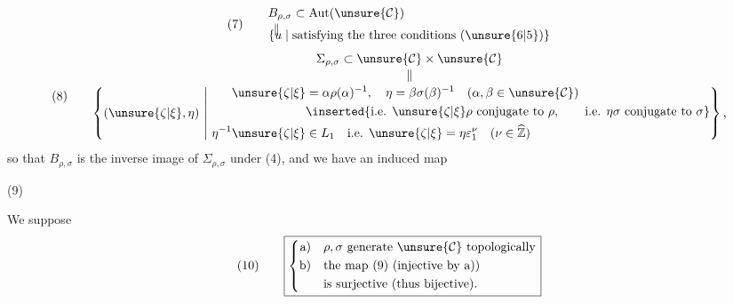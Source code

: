 
\[
(7)\qquad
\begin{aligned}
B_{\rho,\sigma}&\subset\mathrm{Aut}(\unsure{\mathcal{C}})\\[-2pt]
\Vert\quad&\\[-10pt]
\{u\mid{}&\text{satisfying the three conditions }(\unsure{6|5})\}
\end{aligned}
\]
\[
(8)\qquad
\begin{gathered}
\Sigma_{\rho,\sigma}\subset\unsure{\mathcal{C}}\times\unsure{\mathcal{C}}\\[-2pt]
\Vert\\[-2pt]
\left\{(\unsure{\zeta|\xi},\eta)\ \middle|\ 
\begin{aligned}
\unsure{\zeta|\xi}&=\alpha\rho(\alpha)^{-1},\quad
\eta=\beta\sigma(\beta)^{-1}\quad(\alpha,\beta\in\unsure{\mathcal{C}})\\
&\inserted{\text{i.e. }\unsure{\zeta|\xi}\rho\text{ conjugate to }\rho,\qquad\text{i.e. }\eta\sigma\text{ conjugate to }\sigma}\\
\eta^{-1}\unsure{\zeta|\xi}&\in L_1\quad\text{i.e. }\unsure{\zeta|\xi}=\eta\varepsilon_1^\nu\quad(\nu\in\widehat{\mathbb Z})
\end{aligned}\right\},
\end{gathered}
\]
so that $B_{\rho,\sigma}$ is the inverse image of $\Sigma_{\rho,\sigma}$ under (4), and we have an induced map
\begin{samepage}
\diagram{\begin{tikzcd}
B_{\rho,\sigma}\arrow[r,"\varphi=\varphi_{\rho,\sigma}"]&\Sigma_{\rho,\sigma}.
\end{tikzcd}}\hfill(9)
\end{samepage}

We suppose
\[
(10)\qquad\boxed{\left\{\begin{aligned}
\text{a)}\quad&\rho,\sigma\text{ generate }\unsure{\mathcal{C}}\text{ topologically}\\
\text{b)}\quad&\text{the map (9) (injective by a))}\\
&\text{is surjective (thus bijective).}
\end{aligned}\right.}
\]

